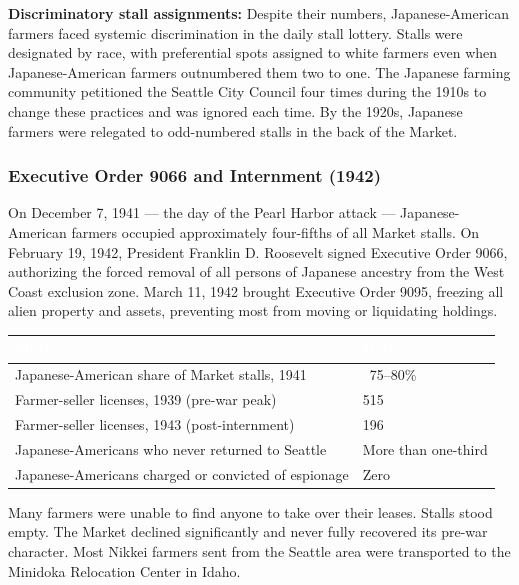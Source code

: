 \documentclass[11pt,letterpaper]{article}
\newcommand{\tableheader}[1]{\textbf{\sffamily\textcolor{white}{#1}}}
\begin{document}
\textbf{Discriminatory stall assignments:} Despite their numbers, Japanese-American farmers faced systemic discrimination in the daily stall lottery. Stalls were designated by race, with preferential spots assigned to white farmers even when Japanese-American farmers outnumbered them two to one. The Japanese farming community petitioned the Seattle City Council four times during the 1910s to change these practices and was ignored each time. By the 1920s, Japanese farmers were relegated to odd-numbered stalls in the back of the Market.

\subsubsection{Executive Order 9066 and Internment (1942)}

On December 7, 1941 --- the day of the Pearl Harbor attack --- Japanese-American farmers occupied approximately four-fifths of all Market stalls. On February 19, 1942, President Franklin D. Roosevelt signed Executive Order 9066, authorizing the forced removal of all persons of Japanese ancestry from the West Coast exclusion zone. March 11, 1942 brought Executive Order 9095, freezing all alien property and assets, preventing most from moving or liquidating holdings.

\begin{center}
\begin{tabularx}{\textwidth}{L{4cm}X}
\toprule
{}
\tableheader{Metric} & \tableheader{Data} \\
\midrule
Japanese-American share of Market stalls, 1941 & ~75--80\% \\
Farmer-seller licenses, 1939 (pre-war peak) & 515 \\
Farmer-seller licenses, 1943 (post-internment) & 196 \\
Japanese-Americans who never returned to Seattle & More than one-third \\
Japanese-Americans charged or convicted of espionage & Zero \\
\bottomrule
\end{tabularx}
\end{center}

Many farmers were unable to find anyone to take over their leases. Stalls stood empty. The Market declined significantly and never fully recovered its pre-war character. Most Nikkei farmers sent from the Seattle area were transported to the Minidoka Relocation Center in Idaho.
\end{document}
